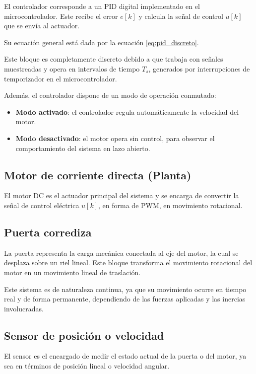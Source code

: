 \documentclass[letter,12pt]{article}
\begin{document}
El controlador corresponde a un PID digital implementado en el microcontrolador. Este recibe el error $e[k]$ y calcula la señal de control $u[k]$ que se envía al actuador.

Su ecuación general está dada por la ecuación \ref{eq:pid_discreto}.

Este bloque es completamente discreto debido a que trabaja con señales muestreadas y opera en intervalos de tiempo $T_s$, generados por interrupciones de temporizador en el microcontrolador.

Además, el controlador dispone de un modo de operación conmutado:
\begin{itemize}
	\item \textbf{Modo activado}: el controlador regula automáticamente la velocidad del motor.
	\item \textbf{Modo desactivado}: el motor opera sin control, para observar el comportamiento del sistema en lazo abierto.
\end{itemize}

\subsection{Motor de corriente directa (Planta)}

El motor DC es el actuador principal del sistema y se encarga de convertir la señal de control eléctrica $u[k]$, en forma de PWM, en movimiento rotacional.

\subsection{Puerta corrediza}

La puerta representa la carga mecánica conectada al eje del motor, la cual se desplaza sobre un riel lineal. Este bloque transforma el movimiento rotacional del motor en un movimiento lineal de traslación.

Este sistema es de naturaleza continua, ya que su movimiento ocurre en tiempo real y de forma permanente, dependiendo de las fuerzas aplicadas y las inercias involucradas.

\subsection{Sensor de posición o velocidad}

El sensor es el encargado de medir el estado actual de la puerta o del motor, ya sea en términos de posición lineal o velocidad angular.  
\end{document}
